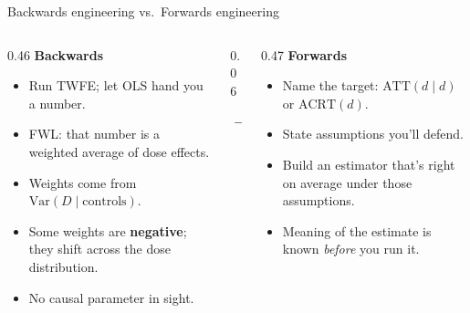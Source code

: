 \documentclass[aspectratio=169,12pt,t]{beamer}
\begin{document}


\begin{frame}{Backwards engineering vs.\ Forwards engineering}
\vspace{0em}

\begin{columns}[T]

\begin{column}{0.46\textwidth}
\textbf{\color{red!70!black}Backwards}
\vspace{0.1em}
\begin{itemize}\setlength\itemsep{0pt}\footnotesize
  \item Run TWFE; let OLS hand you a number.
  \item FWL: that number is a weighted average of dose effects.
  \item Weights come from $\text{Var}(D \mid \text{controls})$.
  \item Some weights are \textbf{negative}; they shift across the dose distribution.
  \item No causal parameter in sight.
\end{itemize}
\end{column}

\begin{column}{0.06\textwidth}
\begin{center}
\vspace{2em}
\color{warmgray}\Large$\to$
\end{center}
\end{column}

\begin{column}{0.47\textwidth}
\textbf{\color{remixgreendark}Forwards}
\vspace{0.1em}
\begin{itemize}\setlength\itemsep{0pt}\footnotesize
  \item Name the target: $\text{ATT}(d \mid d)$ or $\text{ACRT}(d)$.
  \item State assumptions you'll defend.
  \item Build an estimator that's right on average under those assumptions.
  \item Meaning of the estimate is known \textit{before} you run it.
\end{itemize}
\end{column}

\end{columns}

\vspace{0.5em}
\begin{center}
\end{center}
\end{frame}
\end{document}
